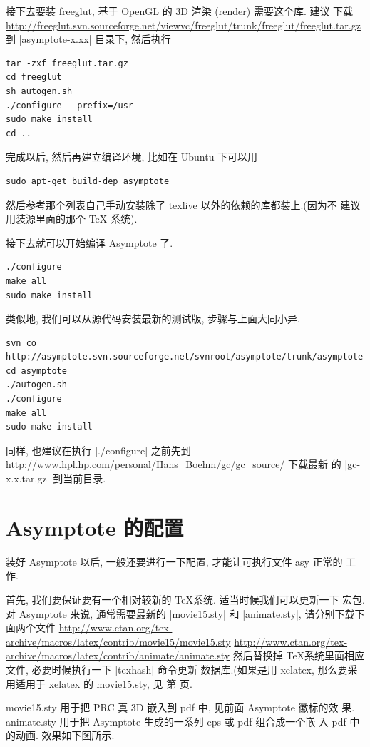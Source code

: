 \documentclass{ctexbook}
\begin{document}
接下去要装 freeglut, 基于 OpenGL 的 3D 渲染 (render) 需要这个库. 建议
下载
\url{http://freeglut.svn.sourceforge.net/viewvc/freeglut/trunk/freeglut/freeglut.tar.gz}
到 |asymptote-x.xx| 目录下, 然后执行
\begin{verbatim}
tar -zxf freeglut.tar.gz
cd freeglut
sh autogen.sh
./configure --prefix=/usr
sudo make install
cd ..
\end{verbatim}
完成以后, 然后再建立编译环境, 比如在 Ubuntu 下可以用
\begin{verbatim}
sudo apt-get build-dep asymptote
\end{verbatim}
然后参考那个列表自己手动安装除了 texlive 以外的依赖的库都装上.(因为不
建议用装源里面的那个 TeX 系统).

接下去就可以开始编译 Asymptote 了.
\begin{verbatim}
./configure
make all
sudo make install
\end{verbatim}

类似地, 我们可以从源代码安装最新的测试版, 步骤与上面大同小异.
\begin{verbatim}
svn co http://asymptote.svn.sourceforge.net/svnroot/asymptote/trunk/asymptote
cd asymptote
./autogen.sh
./configure
make all
sudo make install
\end{verbatim}
同样, 也建议在执行 |./configure| 之前先到
\url{http://www.hpl.hp.com/personal/Hans_Boehm/gc/gc_source/} 下载最新
的 |gc-x.x.tar.gz| 到当前目录.


\section{Asymptote 的配置}
装好 Asymptote 以后, 一般还要进行一下配置, 才能让可执行文件 asy 正常的
工作.\label{asy:Settings}

首先, 我们要保证要有一个相对较新的 \TeX 系统. 适当时候我们可以更新一下
宏包. 对 Asymptote 来说, 通常需要最新的 |movie15.sty| 和 |animate.sty|,
请分别下载下面两个文件
\url{http://www.ctan.org/tex-archive/macros/latex/contrib/movie15/movie15.sty}
\url{http://www.ctan.org/tex-archive/macros/latex/contrib/animate/animate.sty}
然后替换掉 \TeX 系统里面相应文件, 必要时候执行一下 |texhash| 命令更新
数据库.(如果是用 xelatex, 那么要采用适用于 xelatex 的 movie15.sty, 见
第 \pageref{movie15:xelatex} 页.

movie15.sty 用于把 PRC 真 3D 嵌入到 pdf 中, 见前面 Asymptote 徽标的效
果. animate.sty 用于把 Asymptote 生成的一系列 eps 或 pdf 组合成一个嵌
入 pdf 中的动画. 效果如下图所示.
\end{document}
